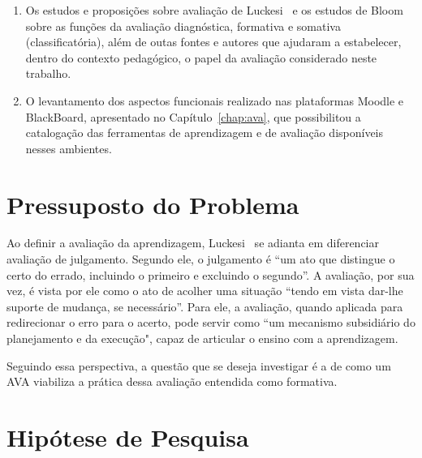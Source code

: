 \begin{enumerate}
	\item Os estudos e proposições sobre avaliação de Luckesi~\cite{luckesi2014avaliaccao} e os estudos de Bloom~\cite{bloom1983manual} sobre as funções da avaliação diagnóstica, formativa e somativa (classificatória), além de outas fontes e autores que ajudaram a estabelecer, dentro do contexto pedagógico, o papel da avaliação considerado neste trabalho.
	\item O levantamento dos aspectos funcionais realizado nas plataformas Moodle e BlackBoard, apresentado no Capítulo~\ref{chap:ava}, que possibilitou a catalogação das ferramentas de aprendizagem e de avaliação disponíveis nesses ambientes.
\end{enumerate}%
 
\bigskip

\section{Pressuposto do Problema}%

Ao definir a avaliação da aprendizagem, Luckesi~\cite{luckesi2014avaliaccao} se adianta em diferenciar avaliação de julgamento. Segundo ele, o julgamento é ``um ato que distingue o certo do errado, incluindo o primeiro e excluindo o segundo''. A avaliação, por sua vez, é vista por ele como o ato de acolher uma situação ``tendo em vista dar-lhe suporte de mudança, se necessário''. Para ele, a avaliação, quando aplicada para redirecionar o erro para o acerto, pode servir como ``um mecanismo subsidiário do planejamento e da execução", capaz de articular o ensino com a aprendizagem.

Seguindo essa perspectiva, a questão que se deseja investigar é a de como um AVA viabiliza a prática dessa avaliação entendida como formativa.

\section{Hipótese de Pesquisa}%

